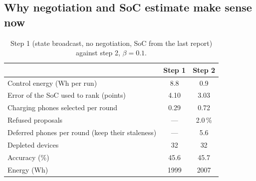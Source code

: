 \documentclass[11pt,a4paper]{article}
\begin{document}
\newpage

\subsection{Why negotiation and SoC estimate make sense now}

\begin{table}[H]
  \centering
  \caption{Step 1 (state broadcast, no negotiation, SoC from the last report)
  against step 2, $\beta = 0.1$.}
  \label{tab:negest}
  \begin{tabular}{lcc}
    \toprule
    & Step 1 & Step 2 \\
    \midrule
    Control energy (Wh per run)                     & 8.8   & 0.9 \\
    Error of the SoC used to rank (points)          & 4.10  & 3.03 \\
    Charging phones selected per round              & 0.29  & 0.72 \\
    Refused proposals                               & ---   & 2.0\,\% \\
    Deferred phones per round (keep their staleness) & ---  & 5.6 \\
    Depleted devices                                & 32    & 32 \\
    Accuracy (\%)                                   & 45.6  & 45.7 \\
    Energy (Wh)                                     & 1999  & 2007 \\
    \bottomrule
  \end{tabular}
\end{table}
\end{document}
